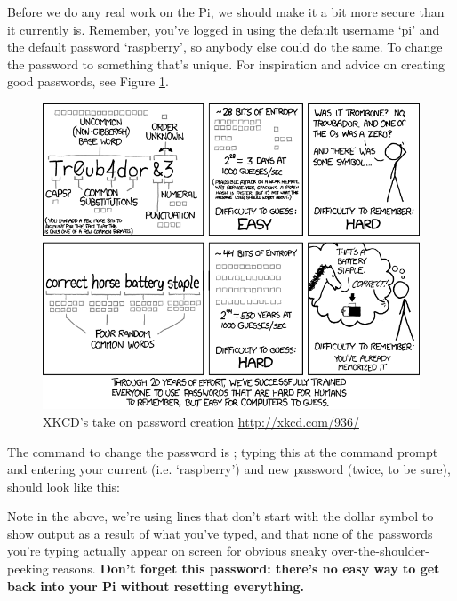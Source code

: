Before we do any real work on the Pi, we should make it a bit more secure than it currently is. Remember, you've logged in using the default username `pi' and the default password `raspberry', so anybody else could do the same. To change the password to something that's unique. For inspiration and advice on creating good passwords, see Figure \ref{figure:xkcd-password}.

\begin{figure}
\centerline{\includegraphics[width=13.5cm]{images/xkcd_password_strength}}
\caption{XKCD's take on password creation \url{http://xkcd.com/936/}}\label{figure:xkcd-password}
\end{figure}

The command to change the password is ; typing this at the command prompt and entering your current (i.e. `raspberry') and new password (twice, to be sure), should look like this:


\noindent Note in the above, we're using lines that don't start with the dollar symbol to show output as a result of what you've typed, and that none of the passwords you're typing actually appear on screen for obvious sneaky over-the-shoulder-peeking reasons. \textbf{Don't forget this password: there's no easy way to get back into your Pi without resetting everything.}

